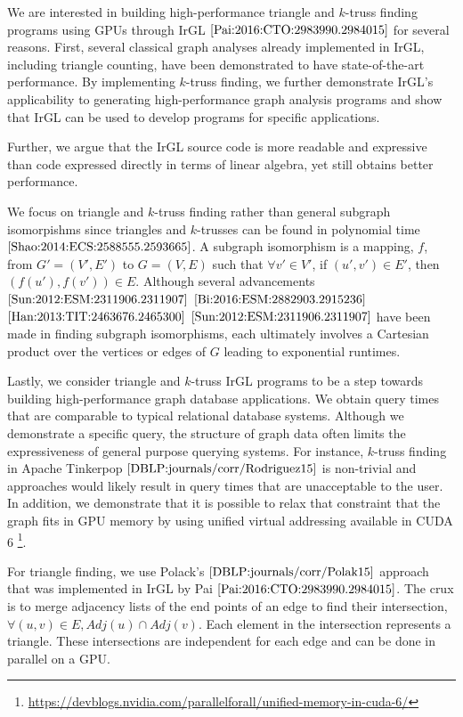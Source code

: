 \documentclass[conference]{IEEEtran}
\begin{document}
We are interested in building high-performance triangle and $k$-truss finding programs using GPUs through IrGL $\cite{Pai:2016:CTO:2983990.2984015}$ for several reasons. First, several classical graph analyses already implemented in IrGL, including triangle counting, have been demonstrated to have state-of-the-art performance. By implementing $k$-truss finding, we further demonstrate IrGL's applicability to generating high-performance graph analysis programs and show that IrGL can be used to develop programs for specific applications.

Further, we argue that the IrGL source code is more readable and expressive than code expressed directly in terms of linear algebra, yet still obtains better performance.

We focus on triangle and $k$-truss finding rather than general subgraph isomorpishms since triangles and $k$-trusses can be found in polynomial time $\cite{Shao:2014:ECS:2588555.2593665}$. A subgraph isomorphism is a mapping, $f$, from $G'=(V',E')$ to $G=(V,E)$ such that $\forall v' \in V'$, if $(u', v') \in E'$, then $(f(u'), f(v')) \in E$. Although several advancements $\cite{Sun:2012:ESM:2311906.2311907}$ $\cite{Bi:2016:ESM:2882903.2915236}$ $\cite{Han:2013:TIT:2463676.2465300}$ $\cite{Sun:2012:ESM:2311906.2311907}$ have been made in finding subgraph isomorphisms, each ultimately involves a Cartesian product over the vertices or edges of $G$ leading to exponential runtimes.

Lastly, we consider triangle and $k$-truss IrGL programs to be a step towards building high-performance graph database applications. We obtain query times that are comparable to typical relational database systems. Although we demonstrate a specific query, the structure of graph data often limits the expressiveness of general purpose querying systems. For instance, $k$-truss finding in Apache Tinkerpop $\cite{DBLP:journals/corr/Rodriguez15}$ is non-trivial and approaches would likely result in query times that are unacceptable to the user. In addition, we demonstrate that it is possible to relax that constraint that the graph fits in GPU memory by using unified virtual addressing available in CUDA 6 \footnote{\url{https://devblogs.nvidia.com/parallelforall/unified-memory-in-cuda-6/}}.

For triangle finding, we use Polack's $\cite{DBLP:journals/corr/Polak15}$ approach that was implemented in IrGL by Pai $\cite{Pai:2016:CTO:2983990.2984015}$. The crux is to merge adjacency lists of the end points of an edge to find their intersection, $\forall (u,v) \in E, Adj(u) \cap Adj(v)$. Each element in the intersection represents a triangle. These intersections are independent for each edge and can be done in parallel on a GPU.
\end{document}
